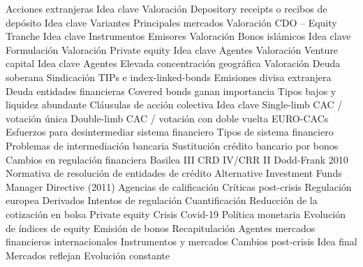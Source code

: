 \documentclass{nuevotema}
\begin{document}
\begin{esquema}[enumerate]
		\2 Acciones extranjeras
			\3 Idea clave
			\3 Valoración
		\2 Depository receipts o recibos de depósito
			\3 Idea clave
			\3 Variantes
			\3 Principales mercados
			\3 Valoración
		\2 CDO -- Equity Tranche
			\3 Idea clave
			\3 Instrumentos
			\3 Emisores
			\3 Valoración
		\2 Bonos islámicos
			\3 Idea clave
			\3 Formulación
			\3 Valoración
		\2 Private equity
			\3 Idea clave
			\3 Agentes
			\3 Valoración
		\2 Venture capital
			\3 Idea clave
			\3 Agentes
			\3 Elevada concentración geográfica
			\3 Valoración
	\1 
		\2 Deuda soberana
			\3 Sindicación
			\3 TIPs e index-linked-bonds
			\3 Emisiones divisa extranjera
		\2 Deuda entidades financieras
			\3 Covered bonds ganan importancia
			\3 Tipos bajos y liquidez abundante
		\2 Cláusulas de acción colectiva
			\3 Idea clave
			\3 Single-limb CAC / votación única
			\3 Double-limb CAC / votación con doble vuelta
			\3 EURO-CACs
		\2 Esfuerzos para desintermediar sistema financiero
			\3 Tipos de sistema financiero
			\3 Problemas de intermediación bancaria
			\3 Sustitución crédito bancario por bonos
		\2 Cambios en regulación financiera
			\3 Basilea III
			\3 CRD IV/CRR II
			\3 Dodd-Frank 2010
			\3 Normativa de resolución de entidades de crédito
			\3 Alternative Investment Funds Manager Directive (2011)
		\2 Agencias de calificación
			\3 Críticas post-crisis
			\3 Regulación europea
		\2 Derivados
			\3 Intentos de regulación
			\3 Cuantificación
		\2 Reducción de la cotización en bolsa
		\2 Private equity
		\2 Crisis Covid-19
			\3 Política monetaria
			\3 Evolución de índices de equity
			\3 Emisión de bonos
	\1[] 
		\2 Recapitulación
			\3 Agentes mercados financieros internacionales
			\3 Instrumentos y mercados
			\3 Cambios post-crisis
		\2 Idea final
			\3 Mercados reflejan
			\3 Evolución constante

\end{esquema}

\esquemalargo
\end{document}
